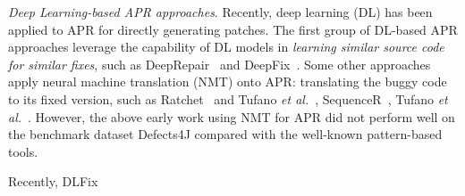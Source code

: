 {\em Deep Learning-based APR approaches}. Recently, deep learning (DL)
has been applied to APR for directly generating patches. 
 The first group of DL-based APR approaches leverage the capability of DL models
in {\em learning similar source code for similar fixes}, such as DeepRepair~\cite{white2016deep} and DeepFix~\cite{gupta2017deepfix}. 
Some other approaches apply neural machine translation (NMT) onto APR: translating the buggy code to its fixed version, such as Ratchet~\cite{hata2018learning} and Tufano {\em et al.}~\cite{tufano2018empirical}, SequenceR~\cite{chen2018sequencer}, Tufano {\em et al.}~\cite{tufano2019learning}. However, the above early work using NMT for APR did not perform well on the benchmark dataset Defects4J compared with the well-known pattern-based tools. 

Recently, DLFix~\cite{li2020dlfix}





